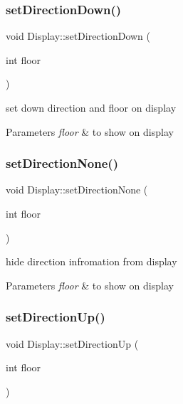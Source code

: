 \subsubsection{\texorpdfstring{set\+Direction\+Down()}{setDirectionDown()}}
{\footnotesize\ttfamily void Display\+::set\+Direction\+Down (\begin{DoxyParamCaption}\item[{int}]{floor }\end{DoxyParamCaption})}



set down direction and floor on display 


\begin{DoxyParams}{Parameters}
{\em floor} & to show on display \\
\hline
\end{DoxyParams}
\mbox{\label{classDisplay_af2e646c93b6d6c1696df35231ad9f87e}} 
\subsubsection{\texorpdfstring{set\+Direction\+None()}{setDirectionNone()}}
{\footnotesize\ttfamily void Display\+::set\+Direction\+None (\begin{DoxyParamCaption}\item[{int}]{floor }\end{DoxyParamCaption})}



hide direction infromation from display 


\begin{DoxyParams}{Parameters}
{\em floor} & to show on display \\
\hline
\end{DoxyParams}
\mbox{\label{classDisplay_a50080126c6dc402d922a4f1c9bcfcb8b}} 
\subsubsection{\texorpdfstring{set\+Direction\+Up()}{setDirectionUp()}}
{\footnotesize\ttfamily void Display\+::set\+Direction\+Up (\begin{DoxyParamCaption}\item[{int}]{floor }\end{DoxyParamCaption})}



